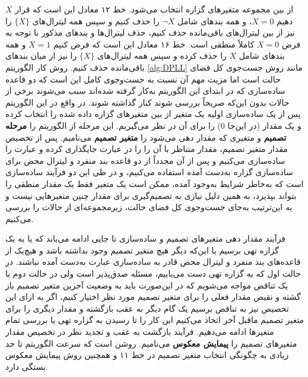 $X$
از بین مجموعه متغیرهای گزاره انتخاب می‌شود. خط  ۱۲ معادل این است که قرار دهیم 
$X = 0$، 
و  همه بندهای شامل 
$\neg X$
را حذف کنیم و سپس  همه لیترال‌های 
$\{X\}$
را  نیز از بین لیترال‌های باقی‌مانده حذف کنیم،  حذف لیترال‌ها و بندهای مذکور با توجه به فرض 
$X = 0$
کاملاً منطقی است.  خط ۱۶ معادل این است که فرض کنیم 
$X = 1$
و همه بندهای شامل 
$X$
را حذف کرده و سپس همه لیترال‌های 
$\{X\}$
را  نیز  از میان  بندهای باقی‌مانده  حذف کنیم.  روش کار الگوریتم 
\ref{alg:DPLL}
مانند روش جست‌جوی کل فضای حالت است اما  مزیت مهم آن نسبت به جست‌وجوی کامل  این است که دو قاعده ساده‌سازی که در ابتدای این الگوریتم به‌کار گرفته شده‌اند سبب می‌شوند برخی از حالات  بدون این‌که صریحاً بررسی شوند کنار گذاشته شوند.  در واقع در این الگوریتم پس از یک ساده‌سازی اولیه یک متغیر از بین متغیرهای گزاره داده شده را انتخاب کرده و یک مقدار (در این‌جا 
$0$)
 را برای آن در نظر می‌گیریم. این مرحله از الگوریتم را 
\textbf{مرحله تصمیم}
و متغیری که مقدار دهی می‌شود را 
\textbf{متغیر تصمیم}
می‌نامیم.  پس از تخصیص مقدار  متغیر تصمیم، مقدار متناظر با آن را  را در عبارت جایگذاری کرده و عبارت را ساده‌سازی می‌کنیم  و پس از آن مجدداً از دو قاعده بند منفرد و لیترال محض برای ساده‌سازی گزاره به‌دست آمده استفاده می‌کنیم، و در طی این دو فرآیند ساده‌سازی است که به‌خاطر شرایط به‌وجود آمده، ممکن است یک متغیر فقط یک مقدار منطقی را بتواند بپذیرد، به همین دلیل نیازی به تصمیم‌گیری برای مقدار چنین متغیرهایی نیست و به  این‌ترتیب به‌جای جست‌وجوی کل فضای حالت، زیرمجموعه‌ای از حالات را بررسی می‌کنیم. 

فرآیند مقدار دهی متغیرهای تصمیم و ساده‌سازی تا جایی ادامه می‌یابد که یا به یک گزاره تهی برسیم  یا این‌که دیگر هیچ متغیر تصمیم وجود نداشته باشد و هیچ‌یک از  قاعده‌های بند منفرد و لیترال محض قادر به ساده‌سازی عبارت به‌دست آمده نباشند. در حالت اول که به گزاره تهی دست می‌یابیم، مسئله صدق‌پذیر است ولی در حالت دوم  با یک تناقض مواجه می‌شویم که در این‌صورت باید به  وضعیت آخرین متغیر تصمیم  باز گشته  و نقیض مقدار فعلی را برای متغیر تصمیم مورد نظر اختیار  ‌کنیم، اگر به ازای این تخصیص نیز به تناقض برسیم یک گام دیگر به عقب بازگشته  و مقدار دیگری را برای متغیر تصمیم ماقبل آخر اتخاذ می‌کنیم این کار را تا رسیدن به گزاره تهی یا  بررسی تمام متغیرها ادامه می‌دهیم. فرآیند بازگشت به عقب و تجدید نظر در تخصیص مقدار  متغیرهای تصمیم را 
\textbf{پیمایش معکوس}
می‌نامیم.  روشن است که  سرعت الگوریتم  تا حد زیادی به چگونگی انتخاب متغیر تصمیم در خط ۱۱ و همچنین روش پیمایش معکوس  بستگی دارد. 

